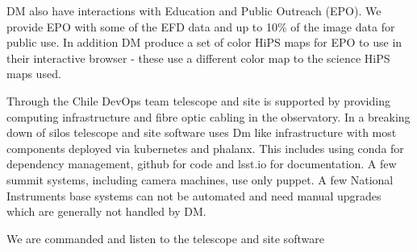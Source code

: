 DM also have interactions with Education and Public Outreach (EPO).
We provide EPO with some of the EFD data and up to 10\% of the image data for public use.
In addition DM produce a set of color HiPS \cite{2017ivoa.spec.0519F} maps for EPO to use in their interactive browser - these use a different color map to the science HiPS maps used.


Through the Chile DevOps team telescope and site is supported by providing computing infrastructure and fibre optic cabling in the observatory.
In a breaking down of silos telescope and site software uses Dm like infrastructure with most components deployed via kubernetes and phalanx.
This includes using conda for dependency management, github for code and lsst.io for documentation.
A few  summit systems, including camera machines,  use only puppet.
A few National Instruments base systems can not be automated and need manual upgrades which are generally not handled by DM.




We are commanded and listen to the telescope  and site software  \citep{2022SPIE12182E..0WT}


